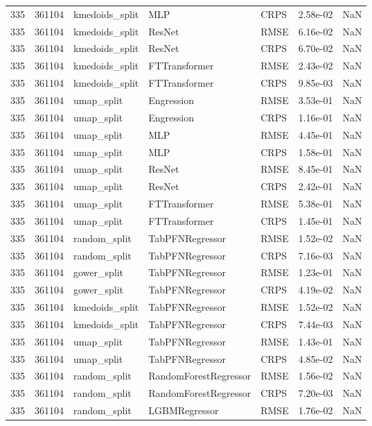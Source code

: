 \begin{tabular}{rrlllrr}
335 & 361104 & kmedoids\_split & MLP & CRPS & 2.58e-02 & NaN \\
335 & 361104 & kmedoids\_split & ResNet & RMSE & 6.16e-02 & NaN \\
335 & 361104 & kmedoids\_split & ResNet & CRPS & 6.70e-02 & NaN \\
335 & 361104 & kmedoids\_split & FTTransformer & RMSE & 2.43e-02 & NaN \\
335 & 361104 & kmedoids\_split & FTTransformer & CRPS & 9.85e-03 & NaN \\
335 & 361104 & umap\_split & Engression & RMSE & 3.53e-01 & NaN \\
335 & 361104 & umap\_split & Engression & CRPS & 1.16e-01 & NaN \\
335 & 361104 & umap\_split & MLP & RMSE & 4.45e-01 & NaN \\
335 & 361104 & umap\_split & MLP & CRPS & 1.58e-01 & NaN \\
335 & 361104 & umap\_split & ResNet & RMSE & 8.45e-01 & NaN \\
335 & 361104 & umap\_split & ResNet & CRPS & 2.42e-01 & NaN \\
335 & 361104 & umap\_split & FTTransformer & RMSE & 5.38e-01 & NaN \\
335 & 361104 & umap\_split & FTTransformer & CRPS & 1.45e-01 & NaN \\
335 & 361104 & random\_split & TabPFNRegressor & RMSE & 1.52e-02 & NaN \\
335 & 361104 & random\_split & TabPFNRegressor & CRPS & 7.16e-03 & NaN \\
335 & 361104 & gower\_split & TabPFNRegressor & RMSE & 1.23e-01 & NaN \\
335 & 361104 & gower\_split & TabPFNRegressor & CRPS & 4.19e-02 & NaN \\
335 & 361104 & kmedoids\_split & TabPFNRegressor & RMSE & 1.52e-02 & NaN \\
335 & 361104 & kmedoids\_split & TabPFNRegressor & CRPS & 7.44e-03 & NaN \\
335 & 361104 & umap\_split & TabPFNRegressor & RMSE & 1.43e-01 & NaN \\
335 & 361104 & umap\_split & TabPFNRegressor & CRPS & 4.85e-02 & NaN \\
335 & 361104 & random\_split & RandomForestRegressor & RMSE & 1.56e-02 & NaN \\
335 & 361104 & random\_split & RandomForestRegressor & CRPS & 7.20e-03 & NaN \\
335 & 361104 & random\_split & LGBMRegressor & RMSE & 1.76e-02 & NaN \\

\end{tabular}
